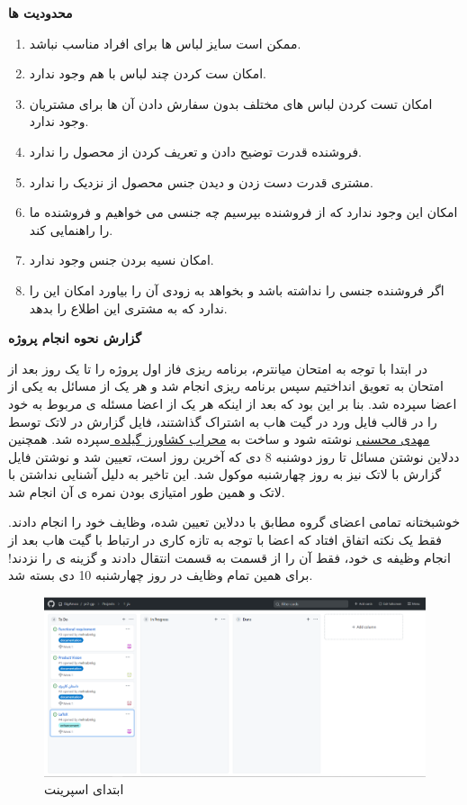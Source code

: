 \documentclass[12pt,a4paper]{article}
\begin{document}
\textbf{	محدودیت ها }

\begin{enumerate}
	

\item
ممکن است سایز لباس ها برای افراد مناسب نباشد.
\item
امکان ست کردن چند لباس با هم وجود ندارد.
\item
امکان تست کردن لباس های مختلف بدون سفارش دادن آن ها برای مشتریان وجود ندارد.
\item
فروشنده قدرت توضیح دادن و تعریف کردن از محصول را ندارد.
\item
مشتری قدرت دست زدن و دیدن جنس محصول از نزدیک را ندارد.
\item
امکان این وجود ندارد که از فروشنده بپرسیم چه جنسی می خواهیم و فروشنده ما را راهنمایی کند.
\item
امکان نسیه بردن جنس وجود ندارد.
\item
اگر فروشنده جنسی را نداشته باشد و بخواهد به زودی آن را بیاورد امکان این را ندارد که به مشتری این اطلاع را بدهد.
	
\end{enumerate}	
\pagebreak

\textbf{گزارش نحوه انجام پروژه}

در ابتدا با توجه به امتحان میانترم، برنامه ریزی فاز اول پروژه را تا یک روز بعد از امتحان به تعویق انداختیم سپس برنامه ریزی انجام شد و هر یک از مسائل به یکی از اعضا سپرده شد. بنا بر این بود که بعد از اینکه هر یک از اعضا مسئله ی مربوط به خود را در قالب فایل ورد در گیت هاب به اشتراک گذاشتند، فایل گزارش در لاتک توسط \underline{مهدی محسنی} نوشته شود و ساخت  به \underline{محراب کشاورز گیلده }سپرده شد. همچنین ددلاین نوشتن مسائل تا روز دوشنبه 8 دی که آخرین روز  است، تعیین شد و نوشتن فایل گزارش با لاتک نیز به روز چهارشنبه موکول شد. این تاخیر به دلیل آشنایی نداشتن با لاتک و همین طور امتیازی بودن نمره ی آن انجام شد.

خوشبختانه تمامی اعضای گروه مطابق با ددلاین تعیین شده، وظایف خود را انجام دادند. فقط یک نکته اتفاق افتاد که اعضا با توجه به تازه کاری در ارتباط با گیت هاب بعد از انجام وظیفه ی خود، فقط آن را از قسمت  به قسمت  انتقال دادند و گزینه ی  را نزدند! برای همین تمام وظایف در روز چهارشنبه 10 دی بسته شد.


	\begin{figure}[h!]
		\begin{center}
			\includegraphics[width=14cm]{images/screenshot_1.png}	
		\end{center}
	\caption{ابتدای اسپرینت}
	\end{figure}
\end{document}
